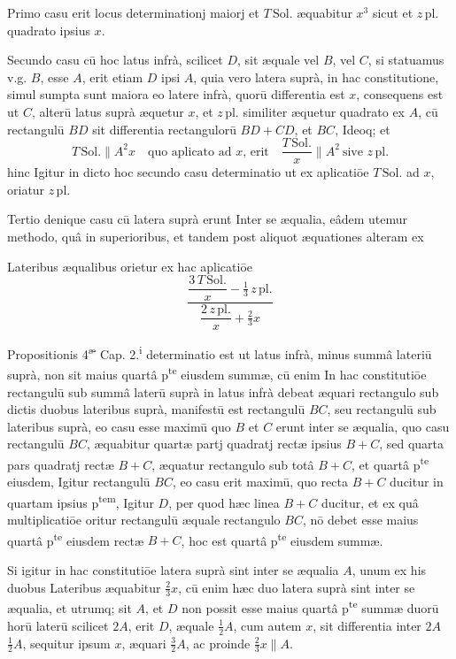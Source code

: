 \documentclass[11pt,a4paper]{article}
\begin{document}
Primo casu erit locus determinationj maiorj et $T\,\mathrm{Sol.}$ æquabitur $x^{3}$ sicut et $z\,\mathrm{pl.}$ quadrato ipsius $x$.

Secundo casu cū hoc latus infrà, scilicet $D$, sit æquale vel $B$, vel $C$, si statuamus v.g. $B$, esse $A$, erit etiam $D$ ipsi $A$, quia vero latera suprà, in hac constitutione, simul sumpta sunt maiora eo latere infrà, quorū differentia est $x$, consequens est ut $C$, alterū latus suprà æquetur $x$, et $z\,\mathrm{pl.}$ similiter æquetur quadrato ex $A$, cū rectangulū $BD$ sit differentia rectangulorū $BD + CD$, et $BC$, Ideoq; et 
\[ T\,\mathrm{Sol.} \parallel A^{2}x \quad \text{quo aplicato ad } x\text{, erit} \quad \frac{T\,\mathrm{Sol.}}{x} \parallel A^{2} \ \text{sive } z\,\mathrm{pl.} \]
hinc Igitur in dicto hoc secundo casu determinatio ut ex aplicatiōe $T\,\mathrm{Sol.}$ ad $x$, oriatur $z\,\mathrm{pl.}$

Tertio denique casu cū latera suprà erunt Inter se æqualia, eâdem utemur methodo, quâ in superioribus, et tandem post aliquot æquationes alteram ex


Lateribus æqualibus orietur ex hac aplicatiōe
\[ \frac{\dfrac{3\,T\,\mathrm{Sol.}}{x} - \tfrac{1}{3}\,z\,\mathrm{pl.}}{\dfrac{2\,z\,\mathrm{pl.}}{x} + \tfrac{2}{3}x} \]

Propositionis 4\textsuperscript{æ} Cap. 2.\textsuperscript{i} determinatio est ut latus infrà, minus summâ lateriū suprà, non sit maius quartâ p\textsuperscript{te} eiusdem summæ, cū enim In hac constitutiōe rectangulū sub summâ laterū suprà in latus infrà debeat æquari rectangulo sub dictis duobus lateribus suprà, manifestū est rectangulū $BC$, seu rectangulū sub lateribus suprà, eo casu esse maximū quo $B$ et $C$ erunt inter se æqualia, quo casu rectangulū $BC$, æquabitur quartæ partj quadratj rectæ ipsius $B + C$, sed quarta pars quadratj rectæ $B + C$, æquatur rectangulo sub totâ $B + C$, et quartâ p\textsuperscript{te} eiusdem, Igitur rectangulū $BC$, eo casu erit maximū, quo recta $B + C$ ducitur in quartam ipsius p\textsuperscript{tem}, Igitur $D$, per quod hæc linea $B + C$ ducitur, et ex quâ multiplicatiōe oritur rectangulū æquale rectangulo $BC$, nō debet esse maius quartâ p\textsuperscript{te} eiusdem rectæ $B + C$, hoc est quartâ p\textsuperscript{te} eiusdem summæ.

Si igitur in hac constitutiōe latera suprà sint inter se æqualia $A$, unum ex his duobus Lateribus æquabitur $\tfrac{2}{3}x$, cū enim hæc duo latera suprà sint inter se æqualia, et utrumq; sit $A$, et $D$ non possit esse maius quartâ p\textsuperscript{te} summæ duorū horū laterū scilicet $2A$, erit $D$, æquale $\tfrac{1}{2}A$, cum autem $x$, sit differentia inter $2A$  $\tfrac{1}{2}A$, sequitur ipsum $x$, æquari $\tfrac{3}{2}A$, ac proinde $\tfrac{2}{3}x \parallel A$.
\end{document}

